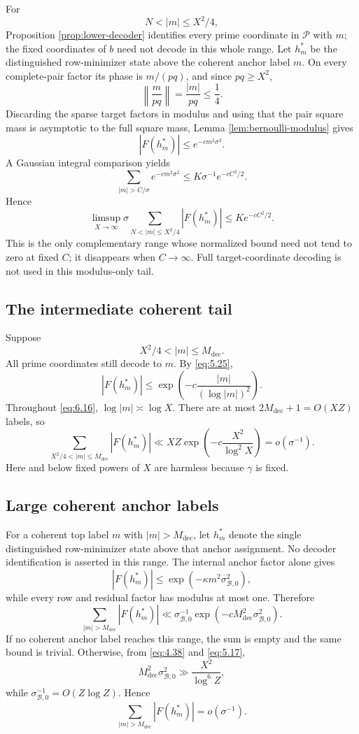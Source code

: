 For
\[
N<|m|\le X^2/4,
\tag{6.12}\label{eq:6.12}
\]
Proposition \ref{prop:lower-decoder} identifies every prime coordinate in $\mathcal P$ with $m$; the fixed coordinates of $b$ need not decode in this whole range. Let $h_m^*$ be the distinguished row-minimizer state above the coherent anchor label $m$. On every complete-pair factor its phase is $m/(pq)$, and since $pq\ge X^2$,
\[
\left\|\frac{m}{pq}\right\|=\frac{|m|}{pq}\le\frac14.
\]
Discarding the sparse target factors in modulus and using that the pair square mass is asymptotic to the full square mass, Lemma \ref{lem:bernoulli-modulus} gives
\[
|F(h_m^*)|\le e^{-cm^2\sigma^2}.
\tag{6.13}\label{eq:6.13}
\]
A Gaussian integral comparison yields
\[
\sum_{|m|>C/\sigma}e^{-cm^2\sigma^2}
\le
K\sigma^{-1}e^{-cC^2/2}.
\tag{6.14}\label{eq:6.14}
\]
Hence
\[
\limsup_{X\to\infty}
\sigma
\sum_{N<|m|\le X^2/4}|F(h_m^*)|
\le
Ke^{-cC^2/2}.
\tag{6.15}\label{eq:6.15}
\]
This is the only complementary range whose normalized bound need not tend to zero at fixed $C$; it disappears when $C\to\infty$. Full target-coordinate decoding is not used in this modulus-only tail.

\subsection{The intermediate coherent tail}

Suppose
\[
X^2/4<|m|\le M_{\mathrm{dec}}.
\tag{6.16}\label{eq:6.16}
\]
All prime coordinates still decode to $m$. By \eqref{eq:5.25},
\[
|F(h_m^*)|
\le
\exp\!\left(-c\frac{|m|}{(\log|m|)^2}\right).
\tag{6.17}\label{eq:6.17}
\]
Throughout \eqref{eq:6.16}, $\log|m|\asymp\log X$. There are at most $2M_{\mathrm{dec}}+1=O(XZ)$ labels, so
\[
\sum_{X^2/4<|m|\le M_{\mathrm{dec}}}|F(h_m^*)|
\ll
XZ\exp\!\left(-c\frac{X^2}{\log^2X}\right)
=o(\sigma^{-1}).
\tag{6.18}\label{eq:6.18}
\]
Here and below fixed powers of $X$ are harmless because $\gamma$ is fixed.

\subsection{Large coherent anchor labels}

For a coherent top label $m$ with $|m|>M_{\mathrm{dec}}$, let $h_m^*$ denote the single distinguished row-minimizer state above that anchor assignment. No decoder identification is asserted in this range. The internal anchor factor alone gives
\[
|F(h_m^*)|
\le
\exp(-\kappa m^2\sigma_{\mathcal B,0}^2),
\]
while every row and residual factor has modulus at most one. Therefore
\[
\sum_{|m|>M_{\mathrm{dec}}}|F(h_m^*)|
\ll
\sigma_{\mathcal B,0}^{-1}
\exp\!\left(-cM_{\mathrm{dec}}^2\sigma_{\mathcal B,0}^2\right).
\tag{6.19}\label{eq:6.19}
\]
If no coherent anchor label reaches this range, the sum is empty and the same bound is trivial. Otherwise, from \eqref{eq:4.38} and \eqref{eq:5.17},
\[
M_{\mathrm{dec}}^2\sigma_{\mathcal B,0}^2
\gg
\frac{X^2}{\log^6Z},
\tag{6.20}\label{eq:6.20}
\]
while $\sigma_{\mathcal B,0}^{-1}=O(Z\log Z)$. Hence
\[
\sum_{|m|>M_{\mathrm{dec}}}|F(h_m^*)|
=o(\sigma^{-1}).
\tag{6.21}\label{eq:6.21}
\]

